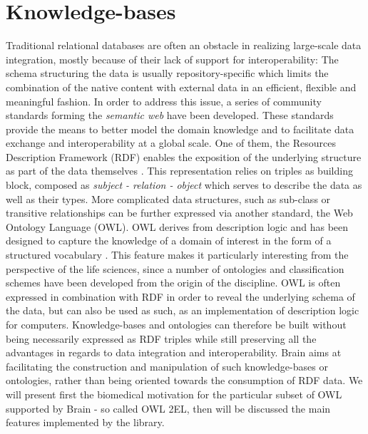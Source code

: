 \documentclass{bioinfo}
\begin{document}
\section{Knowledge-bases}
Traditional relational databases are often an obstacle in realizing large-scale data integration, 
mostly because of their lack of support for 
interoperability: The schema structuring the data is usually repository-specific which limits the combination of the 
native content with external data in an efficient, flexible and meaningful fashion. 
In order to address this issue, 
a series of community standards forming the \emph{semantic web} have been developed. These standards provide the means to better model
the domain knowledge and to facilitate data exchange and interoperability at a global scale.
One of them, the Resources Description 
Framework (RDF) enables the exposition of the underlying structure as part of the data themselves \citep{FrankManola}. This
representation relies on triples as building block, composed as \emph{subject - relation - object} which serves to
describe the data as well as their types. More complicated data structures, such as sub-class or
transitive relationships can be further expressed via another standard, the Web Ontology Language (OWL). OWL derives from description logic and
has been designed to capture the knowledge of a domain of interest in the form of a structured vocabulary \citep{W3COWLWorkingGroup}. 
This feature makes it particularly 
interesting from the perspective of the life sciences, since a number of ontologies and classification schemes
have been developed from the origin of 
the discipline. OWL is often expressed in combination with RDF in order to reveal the underlying schema of the data, but 
can also be used as such, as an implementation of description logic for computers. 
Knowledge-bases and ontologies can therefore be built without being necessarily expressed as RDF triples while still preserving all the 
advantages in regards to data integration and interoperability.
Brain aims at facilitating the construction and manipulation of 
such knowledge-bases or ontologies, rather than being oriented towards the consumption of RDF data. 
We will present first the biomedical motivation for the particular subset of OWL supported by Brain - so called OWL 2EL, 
then will be discussed the main features implemented by the library.
\end{document}
